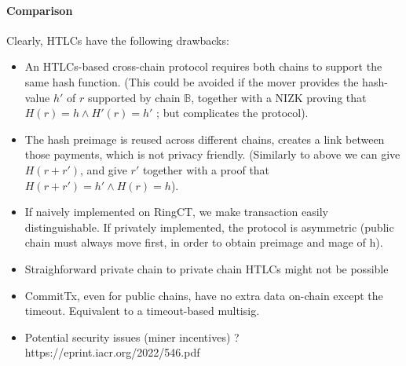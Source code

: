 \paragraph*{Comparison}
Clearly, HTLCs have the following drawbacks:
\begin{itemize}
	\item An HTLCs-based cross-chain protocol requires both chains to support the same hash function. (This could be avoided if the mover provides the hash-value $h'$ of $r$ supported by chain $\mathbb{B}$, together with a NIZK proving that $H(r) = h \land H'(r) = h'$ ; but complicates the protocol).
	\item The hash preimage is reused across different chains, creates a link between those payments, which is not privacy friendly. (Similarly to above we can give $H(r+r')$, and give $r'$ together with a proof that $H(r+r') = h' \land H(r) = h$).
	\item If naively implemented on RingCT, we make transaction easily distinguishable. If privately implemented, the protocol is asymmetric (public chain must always move first, in order to obtain preimage and mage of h).
	\item Straighforward private chain to private chain HTLCs might not be possible
	\item CommitTx, even for public chains, have no extra data on-chain except the timeout. Equivalent to a timeout-based multisig.
	\item Potential security issues (miner incentives) ? https://eprint.iacr.org/2022/546.pdf
\end{itemize}
